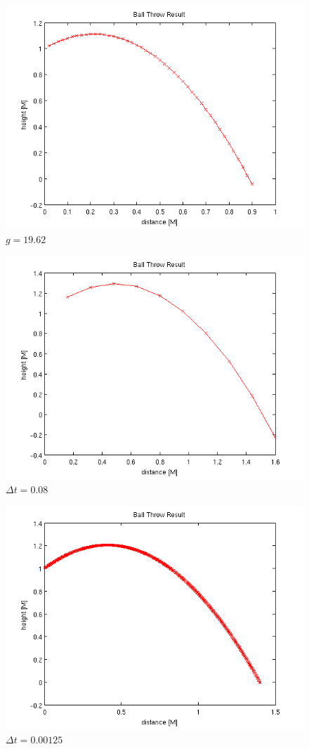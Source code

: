 \begin{figure}
\centering
\includegraphics[scale=0.75]{moargravity}
\caption{$g = 19.62$ \label{moarg}}
\end{figure}

\begin{figure}
\centering
\includegraphics[scale=0.75]{lesstime}
\caption{$\Delta t = 0.08$ \label{lesst}}
\end{figure}

\begin{figure}
\centering
\includegraphics[scale=0.75]{moartime}
\caption{$\Delta t = 0.00125$ \label{moart}}
\end{figure}
